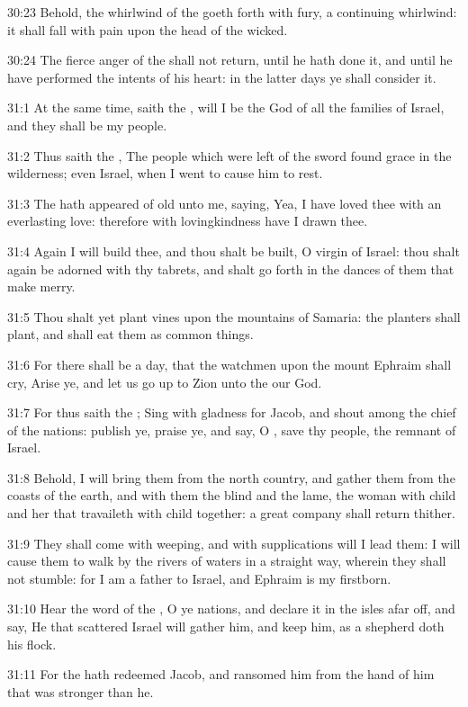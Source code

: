 30:23 Behold, the whirlwind of the \LORD goeth forth with fury, a continuing whirlwind: it shall fall with pain upon the head of the wicked.

30:24 The fierce anger of the \LORD shall not return, until he hath done it, and until he have performed the intents of his heart: in the latter days ye shall consider it.

31:1 At the same time, saith the \LORD, will I be the God of all the families of Israel, and they shall be my people.

31:2 Thus saith the \LORD, The people which were left of the sword found grace in the wilderness; even Israel, when I went to cause him to rest.

31:3 The \LORD hath appeared of old unto me, saying, Yea, I have loved thee with an everlasting love: therefore with lovingkindness have I drawn thee.

31:4 Again I will build thee, and thou shalt be built, O virgin of Israel: thou shalt again be adorned with thy tabrets, and shalt go forth in the dances of them that make merry.

31:5 Thou shalt yet plant vines upon the mountains of Samaria: the planters shall plant, and shall eat them as common things.

31:6 For there shall be a day, that the watchmen upon the mount Ephraim shall cry, Arise ye, and let us go up to Zion unto the \LORD our God.

31:7 For thus saith the \LORD; Sing with gladness for Jacob, and shout among the chief of the nations: publish ye, praise ye, and say, O \LORD, save thy people, the remnant of Israel.

31:8 Behold, I will bring them from the north country, and gather them from the coasts of the earth, and with them the blind and the lame, the woman with child and her that travaileth with child together: a great company shall return thither.

31:9 They shall come with weeping, and with supplications will I lead them: I will cause them to walk by the rivers of waters in a straight way, wherein they shall not stumble: for I am a father to Israel, and Ephraim is my firstborn.

31:10 Hear the word of the \LORD, O ye nations, and declare it in the isles afar off, and say, He that scattered Israel will gather him, and keep him, as a shepherd doth his flock.

31:11 For the \LORD hath redeemed Jacob, and ransomed him from the hand of him that was stronger than he.


